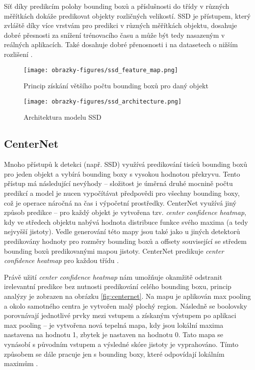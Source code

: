 Síť díky predikcím polohy bounding boxů a příslušnosti do třídy v různých měřítkách dokáže predikovat objekty rozličných velikostí. SSD je přístupem, který zvláště díky více vrstvám pro predikci v různých měřítkách objektu, dosahuje dobré přesnosti za snížení trénovacího času a může být tedy nasazeným v reálných aplikacích. Také dosahuje dobré přenosnosti i na datasetech o nižším rozlišení \cite{SSD, SSDFasterR-CNNComparison}.

\begin{figure}[!htbp]
    \centering
    \texttt{[image: obrazky-figures/ssd\_feature\_map.png]}
    \caption{Princip získání většího počtu bounding boxů pro daný objekt \cite{SSD}}
    \label{fig:ssdfeaturemap}
\end{figure} 

\begin{figure}[!htbp]
    \centering
    \texttt{[image: obrazky-figures/ssd\_architecture.png]}
    \caption{Architektura modelu SSD \cite{SSD}}
    \label{fig:ssdarchitecture}
\end{figure} 

\subsection{CenterNet}
Mnoho přístupů k detekci (např. SSD) využívá predikování tisíců bounding boxů pro jeden objekt a vybírá bounding boxy s vysokou hodnotou překryvu. Tento přístup má následující nevýhody -- složitost je úměrná druhé mocnině počtu predikcí a model je nucen vypočítávat předpovědi pro všechny bounding boxy, což je operace náročná na čas i výpočetní prostředky. CenterNet využívá jiný způsob predikce -- pro každý objekt je vytvořena tzv. \textit{center confidence heatmap}, kdy ve středech objektu nabývá hodnota distribuce funkce svého maxima (a tedy nejvyšší jistoty). Vedle generování této mapy jsou také jako u jiných detektorů predikovány hodnoty pro rozměry bounding boxů a offsety související se středem bounding boxů predikovanými mapou jistoty. CenterNet predikuje \textit{center confidence heatmap} pro každou třídu \cite{CenterNet}.

Právě užití \textit{center confidence heatmap} nám umožňuje okamžitě odstranit irelevantní predikce bez nutnosti predikování celého bounding boxu, princip analýzy je zobrazen na obrázku \ref{fig:centernet}. Na mapu je aplikován max pooling a okolo samotného centra je vytvořen malý plochý region. Následně se boolovsky porovnávají jednotlivé prvky mezi vstupem a získaným výstupem po aplikaci max pooling -- je vytvořena nová tepelná mapa, kdy jsou lokální maxima nastavena na hodnotu 1, zbytek je nastaven na hodnotu 0. Tato mapa se vynásobí s původním vstupem a výsledné skóre jistoty je vyprahováno. Tímto způsobem se dále pracuje jen s bounding boxy, které odpovídají lokálním maximům \cite{CenterNet}.

